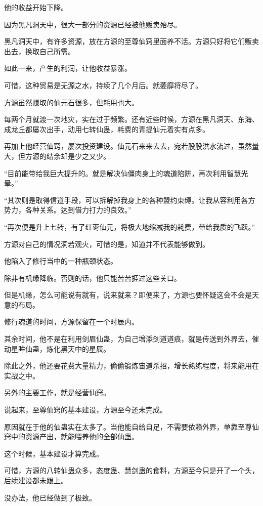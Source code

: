 \begin{this_body}
他的收益开始下降。

因为黑凡洞天中，很大一部分的资源已经被他贩卖殆尽。

黑凡洞天中，有许多资源，放在方源的至尊仙窍里面养不活。方源只好将它们贩卖出去，换取自己所需。

如此一来，产生的利润，让他收益暴涨。

可惜，这种贸易是无源之水，持续了几个月后。就萎靡将尽了。

方源虽然赚取的仙元石很多，但耗用也大。

每两个月就渡一次地灾，实在过于频繁。还有近些时候，方源在黑凡洞天、东海、成龙丘都屡次出手，动用七转仙蛊，耗费的青提仙元着实有点多。

再加上他经营仙窍，屡次投资建设。仙元石来来去去，宛若股股洪水流过，虽然量大，但方源的结余却是少之又少。

“目前能带给我巨大提升的。就是解决仙僵肉身上的魂道陷阱，再次利用智慧光晕。”

“其次则是取得信道手段，可以拆解掉我身上的各种盟约束缚。让我从容利用各方势力，各种关系。达到借力打力的良效。”

“再次便是升上七转，有了红枣仙元，将极大地缩减我的耗费，带给我质的飞跃。”

方源对自己的情况洞若观火，可惜的是，知道并不代表能够做到。

他陷入了修行当中的一种瓶颈状态。

除非有机缘降临。否则的话，他只能苦苦捱过这些关口。

但是机缘，怎么可能说有就有，说来就来？即便来了，方源也要怀疑这会不会是天意的布局。

修行魂道的时间，方源保留在一个时辰内。

其余时间，他不是在利用剑眉仙蛊，为自己增添剑道道痕，就是传送到外界去，催动星眸仙蛊，炼化黑天中的星辰。

除此之外，他还要花费大量精力，偷偷锻炼宙道杀招，增长熟练程度，将来能用在实战之中。

另外的主要工作，就是经营仙窍。

说起来，至尊仙窍的基本建设，方源至今还未完成。

原因就在于他的仙蛊实在太多了。当他能自给自足，不需要依赖外界，单靠至尊仙窍中的资源产出，就能喂养他的全部仙蛊。

这个时候，基本建设才算完成。

可惜，方源的八转仙蛊众多，态度蛊、慧剑蛊的食料，方源至今只是开了一个头，后续建设都未跟上。

没办法，他已经做到了极致。


\end{this_body}

